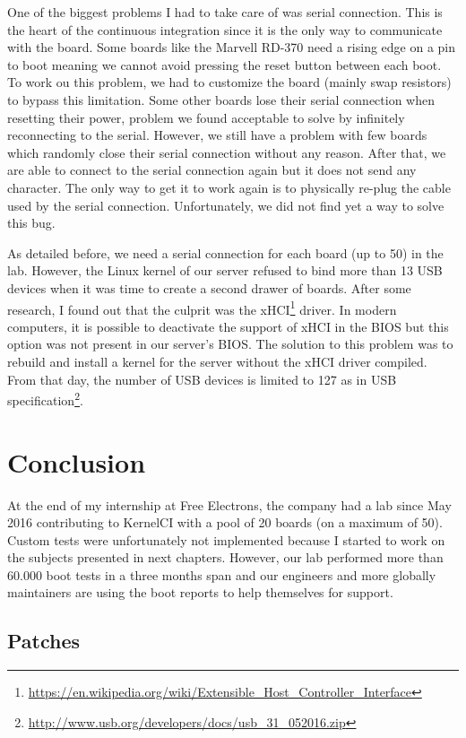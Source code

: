 One of the biggest problems I had to take care of was serial connection. This is the heart of the continuous integration since it is the only way to communicate with the board. Some boards like the Marvell RD-370 need a rising edge on a pin to boot meaning we cannot avoid pressing the reset button between each boot. To work ou this problem, we had to customize the board (mainly swap resistors) to bypass this limitation. Some other boards lose their serial connection when resetting their power, problem we found acceptable to solve by infinitely reconnecting to the serial. However, we still have a problem with few boards which randomly close their serial connection without any reason. After that, we are able to connect to the serial connection again but it does not send any character. The only way to get it to work again is to physically re-plug the cable used by the serial connection. Unfortunately, we did not find yet a way to solve this bug.

As detailed before, we need a serial connection for each board (up to 50) in the lab. However, the Linux kernel of our server refused to bind more than 13 USB devices when it was time to create a second drawer of boards. After some research, I found out that the culprit was the xHCI\footnote{\url{https://en.wikipedia.org/wiki/Extensible\_Host\_Controller\_Interface}} driver. In modern computers, it is possible to deactivate the support of xHCI in the BIOS but this option was not present in our server's BIOS. The solution to this problem was to rebuild and install a kernel for the server without the xHCI driver compiled. From that day, the number of USB devices is limited to 127 as in USB specification\footnote{\url{http://www.usb.org/developers/docs/usb\_31\_052016.zip}}.

\section{Conclusion}
At the end of my internship at Free Electrons, the company had a lab since May 2016 contributing to KernelCI with a pool of 20 boards (on a maximum of 50). Custom tests were unfortunately not implemented because I started to work on the subjects presented in next chapters. However, our lab performed more than 60.000 boot tests in a three months span and our engineers and more globally maintainers are using the boot reports to help themselves for support.

\subsection{Patches}

